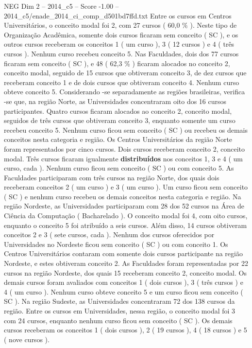 \begin{textsample}{NEG Dim 2 – 2014\_c5 – Score -1.00 – 2014\_c5/enade\_2014\_ci\_comp\_d501bd7ffd.txt}
Entre os cursos em Centros Universitários, o conceito modal foi 2, com 27 cursos ( 60,0 \% ).
Neste tipo de Organização Acadêmica, somente dois cursos ficaram sem conceito ( SC ), e os outros cursos receberam os conceitos 1 ( um curso ), 3 ( 12 cursos ) e 4 ( três cursos ).
Nenhum curso recebeu conceito 5.
Nas Faculdades, dois dos 77 cursos ficaram sem conceito ( SC ), e 48 ( 62,3 \% ) ficaram alocados no conceito 2, conceito modal, seguido de 15 cursos que obtiveram conceito 3, de dez cursos que receberam conceito 1 e de dois cursos que obtiveram conceito 4.
Nenhum curso obteve conceito 5.
Considerando -se separadamente as regiões brasileiras, verifica -se que, na região Norte, as Universidades concentraram oito dos 16 cursos participantes.
Quatro cursos ficaram alocados ao conceito 2, conceito modal, seguidos de três cursos que obtiveram conceito 3, enquanto somente um curso recebeu conceito 5.
Nenhum curso ficou sem conceito ( SC ) ou recebeu os demais conceitos nesta categoria e região.
Os Centros Universitários da região Norte foram representados por cinco cursos.
Dois cursos receberam conceito 2, conceito modal.
Três cursos ficaram igualmente \textbf{distribuídos} nos conceitos 1, 3 e 4 ( um curso, cada ).
Nenhum curso ficou sem conceito ( SC ) ou com conceito 5.
As Faculdades participaram com três cursos na região Norte, dos quais dois receberam conceitos 2 ( um curso ) e 3 ( um curso ).
Um curso ficou sem conceito ( SC ) e nenhum curso recebeu os demais conceitos nesta categoria e região.
Na região Nordeste, as Universidades participaram com 28 dos 52 cursos na Área de Ciência da Computação ( Bacharelado ).
O conceito modal foi 4, com oito cursos, enquanto o conceito 5 foi atribuído a seis cursos.
Além disso, 14 cursos obtiveram conceitos 2 e 3 ( sete cursos, cada ).
Nenhum dos cursos oferecidos por Universidades no Nordeste ficou sem conceito ( SC ) ou com conceito 1.
Os Centros Universitários contaram com somente dois cursos participante na região Nordeste, e estes obtiveram conceito 2.
As Faculdades foram representadas por 22 cursos na região Nordeste, dos quais 15 receberam conceito 2, conceito modal.
Os demais cursos foram avaliados com conceitos 1 ( dois cursos ), 3 ( três cursos ) e 4 ( um curso ).
Nenhum curso obteve conceito 5 e um curso ficou sem conceito ( SC ).
Na região Sudeste, as Universidades concentraram 72 dos 138 cursos da região.
Entre os cursos em Universidades, nessa região, o conceito modal foi 3 com 24 cursos, enquanto nenhum curso ficou sem conceito ( SC ).
Os demais cursos receberam os conceitos 1 ( dois cursos ), 2 ( 19 cursos ), 4 ( 18 cursos ) e 5 ( nove cursos ).

\end{textsample}
